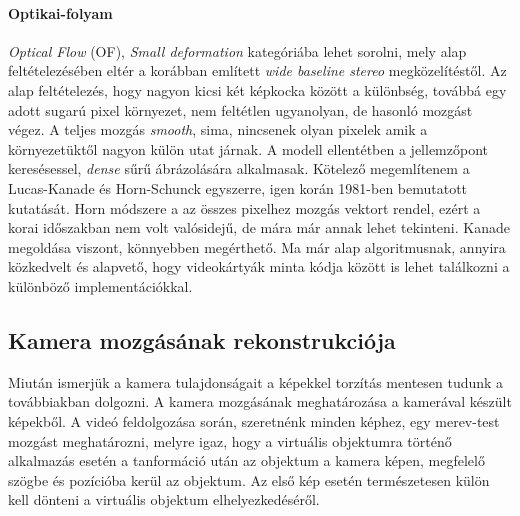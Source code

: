 \documentclass[12pt,a4paper,oneside]{report} %
\begin{document}
\paragraph{Optikai-folyam}
\textit{Optical Flow} (OF), \textit{Small deformation} kategóriába lehet sorolni, mely alap feltételezésében eltér a korábban említett \textit{wide baseline stereo} megközelítéstől. Az alap feltételezés, hogy nagyon kicsi két képkocka között a különbség, továbbá egy adott sugarú pixel környezet, nem feltétlen ugyanolyan, de hasonló  mozgást végez. A teljes mozgás \textit{smooth}, sima, nincsenek olyan pixelek amik a környezetüktől nagyon külön utat járnak.  A modell ellentétben a jellemzőpont keresésessel,  \textit{dense} sűrű ábrázolására alkalmasak. Kötelező megemlítenem a Lucas-Kanade \cite{lucas1981iterative} és Horn-Schunck \cite{horn1981determining} egyszerre, igen korán 1981-ben bemutatott kutatását. Horn módszere a az összes pixelhez  mozgás vektort rendel, ezért a korai időszakban nem volt valósidejű, de mára már annak lehet tekinteni. Kanade megoldása viszont, könnyebben megérthető. Ma már alap algoritmusnak, annyira közkedvelt és alapvető,  hogy videokártyák minta kódja között is lehet találkozni a különböző implementációkkal.
 

\subsection{Kamera mozgásának rekonstrukciója}
Miután ismerjük a kamera tulajdonságait a képekkel torzítás mentesen tudunk a továbbiakban dolgozni.
A kamera mozgásának meghatározása a kamerával készült képekből. A videó feldolgozása során, szeretnénk minden képhez, egy merev-test mozgást meghatározni, melyre igaz, hogy a virtuális objektumra történő alkalmazás esetén a tanformáció után az objektum a kamera képen, megfelelő szögbe és pozícióba kerül az objektum. Az első kép esetén természetesen külön kell dönteni a virtuális objektum elhelyezkedéséről.
\end{document}
